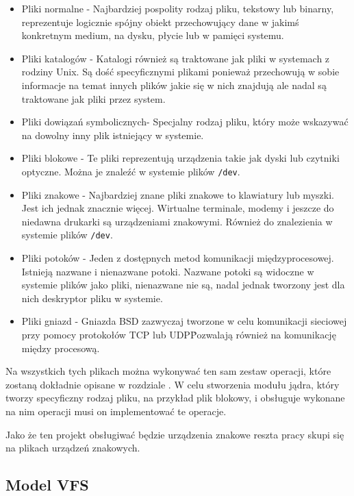 \documentclass[10pt]{scrartcl}
\begin{document}
\begin{itemize}
\itemsep1pt\parskip0pt
\item
  Pliki normalne - Najbardziej pospolity rodzaj pliku, tekstowy lub binarny, reprezentuje logicznie spójny obiekt przechowujący dane w jakimś konkretnym medium, na dysku, płycie lub w pamięci systemu.
\item
  Pliki katalogów - Katalogi również są traktowane jak pliki w systemach z rodziny Unix. Są dość specyficznymi plikami ponieważ przechowują w sobie informacje na temat innych plików jakie się w nich znajdują ale nadal są traktowane jak pliki przez system.
\item
  Pliki dowiązań symbolicznych- Specjalny rodzaj pliku, który może wskazywać na dowolny inny plik istniejący w systemie.
\item
  Pliki blokowe - Te pliki reprezentują urządzenia takie jak dyski lub czytniki optyczne. Można je znaleźć w systemie plików \texttt{/dev}.
\item
  Pliki znakowe - Najbardziej znane pliki znakowe to klawiatury lub myszki. Jest ich jednak znacznie więcej. Wirtualne terminale, modemy i jeszcze do niedawna drukarki są urządzeniami znakowymi. Również do znalezienia w systemie plików \texttt{/dev}.
\item
  Pliki potoków - Jeden z dostępnych metod komunikacji międzyprocesowej.  Istnieją nazwane i nienazwane potoki. Nazwane potoki są widoczne w systemie plików jako pliki, nienazwane nie są, nadal jednak tworzony jest dla nich deskryptor pliku w systemie.
\item
  Pliki gniazd - Gniazda BSD zazwyczaj tworzone w celu komunikacji sieciowej przy pomocy protokołów TCP lub UDP\. Pozwalają również na komunikację między procesową.
\end{itemize}

Na wszystkich tych plikach można wykonywać ten sam zestaw operacji, które zostaną dokładnie opisane w rozdziale . W celu stworzenia modułu jądra, który tworzy specyficzny rodzaj pliku, na przykład plik blokowy, i obsługuje wykonane na nim operacji musi on implementować te operacje.

Jako że ten projekt obsługiwać będzie urządzenia znakowe reszta pracy skupi się na plikach urządzeń znakowych.

\subsection{Model VFS}
\label{vfs}
\end{document}

